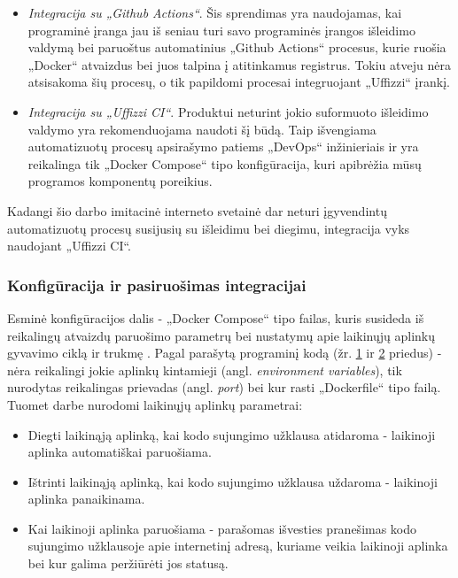 \documentclass{VUMIFPSkursinis}
\begin{document}
\begin{itemize}
  \item \textit{Integracija su „Github Actions“}. Šis sprendimas yra naudojamas, kai programinė įranga jau iš seniau turi savo programinės įrangos išleidimo valdymą bei paruoštus automatinius „Github Actions“ procesus, kurie ruošia „Docker“ atvaizdus bei juos talpina į atitinkamus registrus. Tokiu atveju nėra atsisakoma šių procesų, o tik papildomi procesai integruojant „Uffizzi“ įrankį.

  \item \textit{Integracija su „Uffizzi CI“}. Produktui neturint jokio suformuoto išleidimo valdymo yra rekomenduojama naudoti šį būdą. Taip išvengiama automatizuotų procesų apsirašymo patiems „DevOps“ inžinieriais ir yra reikalinga tik „Docker Compose“ tipo konfigūracija, kuri apibrėžia mūsų programos komponentų poreikius.


\end{itemize}
    
Kadangi šio darbo imitacinė interneto svetainė dar neturi įgyvendintų automatizuotų procesų susijusių su išleidimu bei diegimu, integracija vyks naudojant „Uffizzi CI“.
    \subsubsection{Konfigūracija ir pasiruošimas integracijai}

Esminė konfigūracijos dalis - „Docker Compose“ tipo failas, kuris susideda iš reikalingų atvaizdų paruošimo parametrų bei nustatymų apie laikinųjų aplinkų gyvavimo ciklą ir trukmę \cite{SaltKeturioliktas}. Pagal parašytą programinį kodą (žr. \hyperref[priedas1]{1} ir \hyperref[priedas2]{2} priedus) - nėra reikalingi jokie aplinkų kintamieji (angl. \textit{environment variables}), tik nurodytas reikalingas prievadas (angl. \textit{port}) bei kur rasti „Dockerfile“ tipo failą. Tuomet darbe nurodomi laikinųjų aplinkų parametrai:

\begin{itemize}
  \item Diegti laikinąją aplinką, kai kodo sujungimo užklausa atidaroma - laikinoji aplinka automatiškai paruošiama.

  \item Ištrinti laikinąją aplinką, kai kodo sujungimo užklausa uždaroma - laikinoji aplinka panaikinama.

  \item Kai laikinoji aplinka paruošiama - parašomas išvesties pranešimas kodo sujungimo užklausoje apie internetinį adresą, kuriame veikia laikinoji aplinka bei kur galima peržiūrėti jos statusą.
  
\end{itemize}
\end{document}
